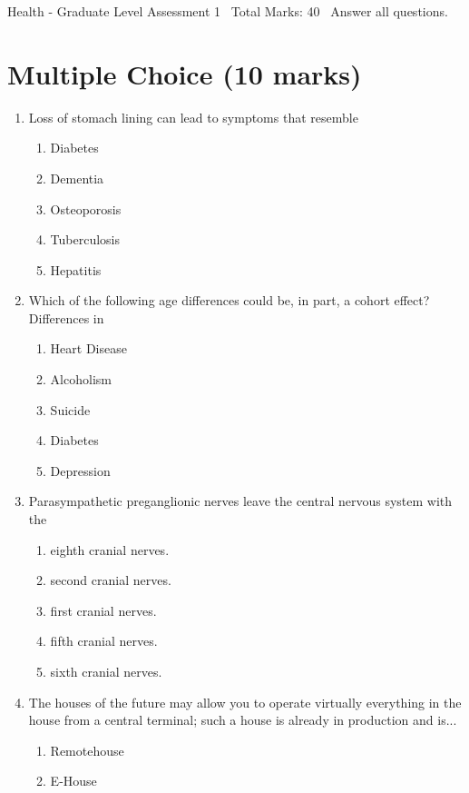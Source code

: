 \documentclass[12pt]{article}
\begin{document}
\begin{center}
Health - Graduate Level Assessment 1 \
Total Marks: 40 \
Answer all questions.
\end{center}

\section*{Multiple Choice (10 marks)}
\begin{enumerate}[label=\arabic*.]
\item Loss of stomach lining can lead to symptoms that resemble
\begin{enumerate}[label=(\alph*)]
    \item Diabetes
    \item Dementia
    \item Osteoporosis
    \item Tuberculosis
    \item Hepatitis
\end{enumerate}
\item Which of the following age differences could be, in part, a cohort effect? Differences in
\begin{enumerate}[label=(\alph*)]
    \item Heart Disease
    \item Alcoholism
    \item Suicide
    \item Diabetes
    \item Depression
\end{enumerate}
\item Parasympathetic preganglionic nerves leave the central nervous system with the
\begin{enumerate}[label=(\alph*)]
    \item eighth cranial nerves.
    \item second cranial nerves.
    \item first cranial nerves.
    \item fifth cranial nerves.
    \item sixth cranial nerves.
\end{enumerate}
\item The houses of the future may allow you to operate virtually everything in the house from a central terminal; such a house is already in production and is...
\begin{enumerate}[label=(\alph*)]
    \item Remotehouse
    \item E-House

\end{enumerate}
\end{enumerate}
\end{document}
